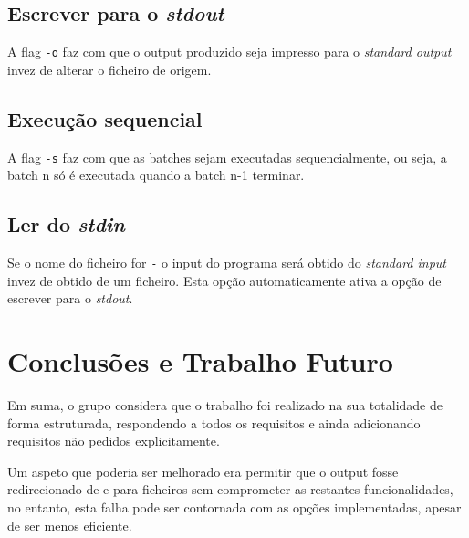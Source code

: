 \documentclass[12pt,a4paper]{report}
\begin{document}
    \section{Escrever para o \textit{stdout}}
        A flag \texttt{-o} faz com que o output produzido seja
        impresso para o \textit{standard output} invez de alterar o ficheiro
        de origem.
    \section{Execução sequencial}
        A flag \texttt{-s} faz com que as batches sejam executadas
        sequencialmente, ou seja, a batch n só é executada quando a batch n-1
        terminar.
    \section{Ler do \textit{stdin}}
        Se o nome do ficheiro for \texttt{-} o input do programa será
        obtido do \textit{standard input} invez de obtido de um ficheiro. Esta
        opção automaticamente ativa a opção de escrever para o \textit{stdout}.

\chapter{Conclusões e Trabalho Futuro}
    Em suma, o grupo considera que o trabalho foi realizado na sua
    totalidade de forma estruturada, respondendo a todos os requisitos e ainda
    adicionando requisitos não pedidos explicitamente.

    Um aspeto que poderia ser melhorado era permitir que o output fosse
    redirecionado de e para ficheiros sem comprometer as restantes
    funcionalidades, no entanto, esta falha pode ser contornada com as opções
    implementadas, apesar de ser menos eficiente.
\end{document}
